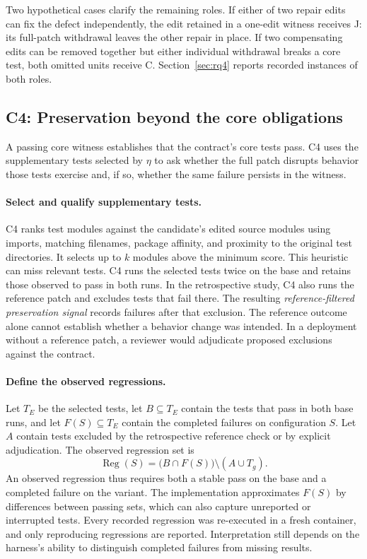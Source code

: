 \documentclass[a4paper,fleqn]{cas-sc}
\newcommand{\lab}[1]{\textsf{#1}}
\begin{document}
Two hypothetical cases clarify the remaining roles. If either of two repair edits can fix the defect independently, the edit retained in a one-edit witness receives \lab{J}: its full-patch withdrawal leaves the other repair in place. If two compensating edits can be removed together but either individual withdrawal breaks a core test, both omitted units receive \lab{C}. Section~\ref{sec:rq4} reports recorded instances of both roles.

\subsection{C4: Preservation beyond the core obligations}\label{sec:envelope}

A passing core witness establishes that the contract's core tests pass. C4 uses the supplementary tests selected by $\eta$ to ask whether the full patch disrupts behavior those tests exercise and, if so, whether the same failure persists in the witness.

\paragraph{Select and qualify supplementary tests.} C4 ranks test modules against the candidate's edited source modules using imports, matching filenames, package affinity, and proximity to the original test directories. It selects up to $k$ modules above the minimum score. This heuristic can miss relevant tests. C4 runs the selected tests twice on the base and retains those observed to pass in both runs. In the retrospective study, C4 also runs the reference patch and excludes tests that fail there. The resulting \emph{reference-filtered preservation signal} records failures after that exclusion. The reference outcome alone cannot establish whether a behavior change was intended. In a deployment without a reference patch, a reviewer would adjudicate proposed exclusions against the contract.

\paragraph{Define the observed regressions.} Let $T_E$ be the selected tests, let $B\subseteq T_E$ contain the tests that pass in both base runs, and let $F(S)\subseteq T_E$ contain the completed failures on configuration $S$. Let $A$ contain tests excluded by the retrospective reference check or by explicit adjudication. The observed regression set is
\begin{equation}
\operatorname{Reg}(S)=\bigl(B\cap F(S)\bigr)\setminus(A\cup T_g).
\label{eq:regression}
\end{equation}
An observed regression thus requires both a stable pass on the base and a completed failure on the variant. The implementation approximates $F(S)$ by differences between passing sets, which can also capture unreported or interrupted tests. Every recorded regression was re-executed in a fresh container, and only reproducing regressions are reported. Interpretation still depends on the harness's ability to distinguish completed failures from missing results.
\end{document}
